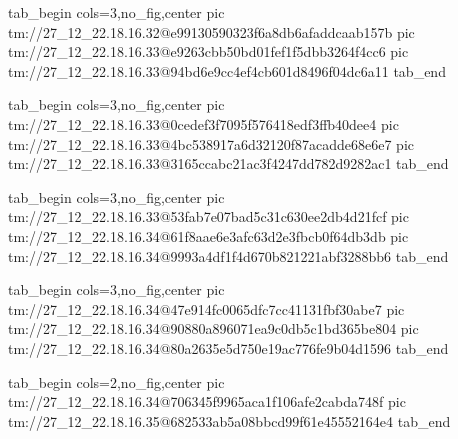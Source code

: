  
 
 
 
 

\qqSecCmtScr


\ifcmt
  tab_begin cols=3,no_fig,center
    pic tm://27_12_22.18.16.32@e99130590323f6a8db6afaddcaab157b
    pic tm://27_12_22.18.16.33@e9263cbb50bd01fef1f5dbb3264f4cc6
    pic tm://27_12_22.18.16.33@94bd6e9cc4ef4cb601d8496f04dc6a11
  tab_end
\fi


\ifcmt
  tab_begin cols=3,no_fig,center
    pic tm://27_12_22.18.16.33@0cedef3f7095f576418edf3ffb40dee4
    pic tm://27_12_22.18.16.33@4bc538917a6d32120f87acadde68e6e7
    pic tm://27_12_22.18.16.33@3165ccabc21ac3f4247dd782d9282ac1
  tab_end
\fi


\ifcmt
  tab_begin cols=3,no_fig,center
    pic tm://27_12_22.18.16.33@53fab7e07bad5c31c630ee2db4d21fcf
    pic tm://27_12_22.18.16.34@61f8aae6e3afc63d2e3fbcb0f64db3db
    pic tm://27_12_22.18.16.34@9993a4df1f4d670b821221abf3288bb6
  tab_end
\fi


\ifcmt
  tab_begin cols=3,no_fig,center
    pic tm://27_12_22.18.16.34@47e914fc0065dfc7cc41131fbf30abe7
    pic tm://27_12_22.18.16.34@90880a896071ea9c0db5c1bd365be804
    pic tm://27_12_22.18.16.34@80a2635e5d750e19ac776fe9b04d1596
  tab_end
\fi


\ifcmt
  tab_begin cols=2,no_fig,center
    pic tm://27_12_22.18.16.34@706345f9965aca1f106afe2cabda748f
    pic tm://27_12_22.18.16.35@682533ab5a08bbcd99f61e45552164e4
  tab_end
\fi


